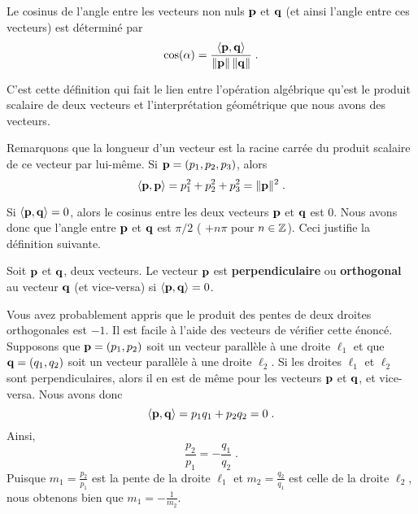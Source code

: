 {\begin{focus}{\dfn} \label{dfncos}
Le cosinus de l'angle entre les vecteurs non nuls $\mathbf{p}$ et
$\mathbf{q}$ (et ainsi l'angle entre ces vecteurs) est déterminé par
\begin{equation}\label{CosVectors}
\cos(\alpha) = \frac{\left\langle{\mathbf{p}} , {\mathbf{q}}\right\rangle}{\|\mathbf{p}\|\,\|\mathbf{q}\|} \; .
\end{equation}
\end{focus}

C'est cette définition qui fait le lien entre l'opération algébrique
qu'est le produit scalaire de deux vecteurs et l'interprétation
géométrique que nous avons des vecteurs.

\begin{rmk}
Remarquons que la longueur d'un vecteur est la racine carrée du produit
scalaire de ce vecteur par lui-même.  Si $\mathbf{p} = (p_1,p_2,p_3)$, alors
\[
\left\langle{\mathbf{p}} , {\mathbf{p}}\right\rangle = p_1^2 + p_2^2 + p_3^2 = \|\mathbf{p}\|^2 \; .
\]

Si $\displaystyle \left\langle{\mathbf{p}} , {\mathbf{q}}\right\rangle = 0$, alors le cosinus entre
les deux vecteurs $\mathbf{p}$ et $\mathbf{q}$ est $0$.  Nous avons donc que
l'angle entre $\mathbf{p}$ et $\mathbf{q}$ est $\pi/2$ ( $+n\pi$ pour
$n \in \mathbb{Z}$).  Ceci justifie la définition suivante.
\end{rmk}

\begin{focus}{\dfn}
Soit $\mathbf{p}$ et $\mathbf{q}$, deux vecteurs.  Le vecteur $\mathbf{p}$ est
{\bfseries perpendiculaire} ou
{\bfseries orthogonal} au vecteur
$\mathbf{q}$ (et vice-versa) si $\displaystyle \left\langle{\mathbf{p}} , {\mathbf{q}}\right\rangle = 0$.
\end{focus}

\begin{rmk}
Vous avez probablement appris que le produit des pentes de deux droites
orthogonales est $-1$.  Il est facile à l'aide des vecteurs de
vérifier cette énoncé.  Supposons que $\mathbf{p} = (p_1,p_2)$ soit un
vecteur parallèle à une droite $\ell_1$ et que $\mathbf{q} = (q_1,q_2)$
soit un vecteur parallèle à une droite $\ell_2$.  Si les droites
$\ell_1$ et $\ell_2$ sont perpendiculaires, alors il en est de même
pour les vecteurs $\mathbf{p}$ et $\mathbf{q}$, et vice-versa.  Nous avons donc
\[
\left\langle{\mathbf{p}} , {\mathbf{q}}\right\rangle = p_1 q_1 + p_2 q_2 = 0 \; .
\]
Ainsi,
\[
\frac{p_2}{p_1} = - \frac{q_1}{q_2} \; .
\]
Puisque $\displaystyle m_1 = \frac{p_2}{p_1}$ est la pente de la droite
$\ell_1$ et $\displaystyle m_2 = \frac{q_2}{q_1}$ est celle de la droite
$\ell_2$, nous obtenons bien que $\displaystyle m_1 = -\frac{1}{m_2}$.
\end{rmk}

}

